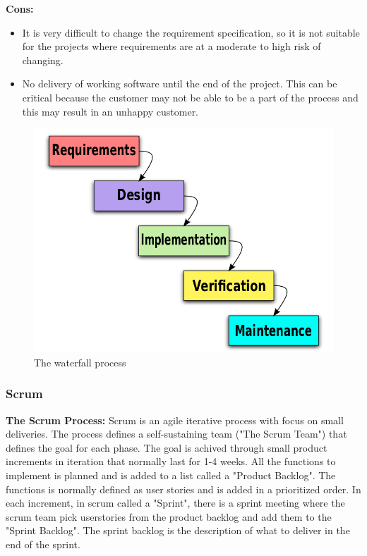 {\bf Cons: }
\begin{itemize}
	\item It is very difficult to change the requirement specification, so it is not suitable for the projects where requirements are at a moderate to high risk of changing.
	\item No delivery of working software until the end of the project. This can be critical because the customer may not
	be able to be a part of the process and this may result in an unhappy customer.
\end{itemize}

\begin{figure}[!ht]
\centering
\includegraphics[scale=0.3]{pictures/Waterfall_model.png}
\caption{The waterfall process}
\label{overflow}
\end{figure}


\subsubsection{Scrum}
{\bf The Scrum Process: } Scrum is an agile iterative process with focus on small deliveries. The process
defines a self-sustaining team ("The Scrum Team") that defines the goal for each phase. The goal 
is achived through small product increments in iteration that normally last for 1-4 weeks. 
All the functions to implement is planned and is added to a list called a "Product Backlog". The
functions is normally defined as user stories and is added in a prioritized order. In each increment, 
in scrum called a "Sprint", there is a sprint meeting where the scrum team pick userstories from the 
product backlog and add them to the "Sprint Backlog". The sprint backlog is the description of what 
to deliver in the end of the sprint.

